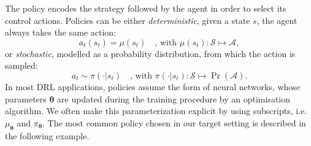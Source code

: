 The policy encodes the strategy followed by the agent in order to select its control actions.
Policies can be either \emph{deterministic}, \ie given a state $s$, the agent always takes the same action:
%
\begin{equation*}
    a_t(s_t) = \mu(s_t) \quad \text{, with } \mu(s_t): \mathcal{S} \mapsto \mathcal{A},
\end{equation*}
%
or \emph{stochastic}, \ie modelled as a probability distribution, from which the action is sampled:
%
\begin{equation*}
    a_t \sim \pi(\cdot|s_t) \quad \text{, with } \pi(\cdot|s_t): \mathcal{S} \mapsto \operatorname{Pr}(\mathcal{A}).
\end{equation*}
%
In most \ac{DRL} applications, policies assume the form of neural networks, whose parameters $\boldsymbol{\theta}$ are updated during the training procedure by an optimisation algorithm.
We often make this parameterization explicit by using subscripts, i.e.\ $\mu_{\boldsymbol{\theta}}$ and $\pi_{\boldsymbol{\theta}}$.
%
The most common policy chosen in our target setting is described in the following example.
%

